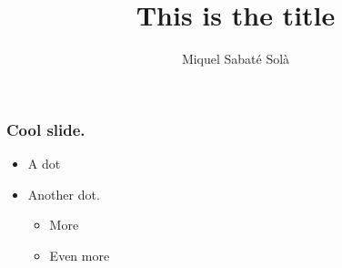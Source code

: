 \documentclass[12pt]{beamer}
\title{This is the title}
\author{Miquel Sabaté Solà}
\date{}
\begin{document}
\frame{\titlepage}


\begin{frame}
\vfill
  \frametitle{Cool slide.}
  \begin{itemize}
    \item A dot
    \vfill
    \item Another dot.
    \vfill
    \begin{itemize}
     \item More
     \vfill
     \item Even more
    \end{itemize}

  \end{itemize}
\vfill
\end{frame}
\end{document}
